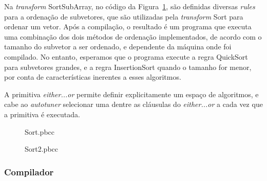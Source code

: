 \documentclass[a4paper, 11pt]{article}
\begin{document}
Na \emph{transform} SortSubArray, no código da Figura~\ref{fig:sortpbcc}, são 
definidas diversas \emph{rules} para a ordenação de subvetores, que
são utilizadas pela \emph{transform} Sort para ordenar um vetor. Após a
compilação, o resultado é um programa que executa uma combinação dos dois
métodos de ordenação implementados, de acordo com o tamanho do subvetor a
ser ordenado, e dependente da máquina onde foi compilado. No entanto, esperamos
que o programa execute a regra QuickSort para subvetores grandes, e a 
regra InsertionSort quando o tamanho for menor, por conta de características
inerentes a esses algoritmos.

A primitiva \emph{either...or} permite definir explicitamente um espaço
de algoritmos, e cabe ao \emph{autotuner} selecionar uma dentre as cláusulas
do \emph{either...or} a cada vez que a primitiva é executada.

\begin{figure}[H]
    \centering
    
    \caption{Sort.pbcc}
    \label{fig:sortpbcc}
\end{figure}

\begin{figure}[H]
    \centering
    
    \caption{Sort2.pbcc}
    \label{fig:sort2pbcc}
\end{figure}

\subsubsection{Compilador}
\end{document}
